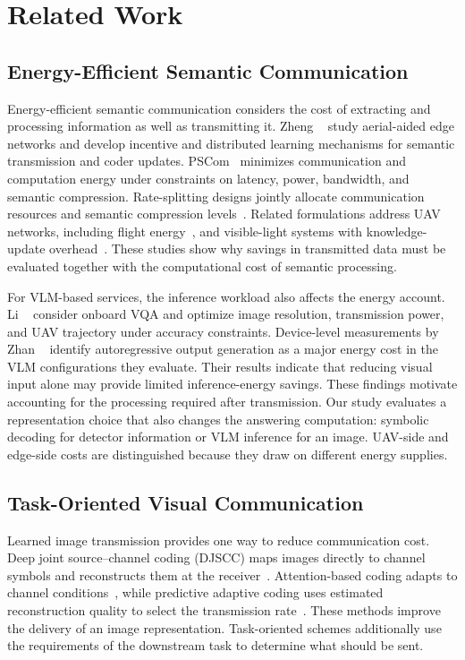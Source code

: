 \section{Related Work}\label{sec:related}

\subsection{Energy-Efficient Semantic Communication}
Energy-efficient semantic communication considers the cost of extracting
and processing information as well as transmitting it.
Zheng \etal~\cite{zheng2024aerialee} study aerial-aided edge networks
and develop incentive and distributed learning mechanisms for semantic
transmission and coder updates. PSCom~\cite{dai2025pscom} minimizes
communication and computation energy under constraints on latency,
power, bandwidth, and semantic compression. Rate-splitting designs
jointly allocate communication resources and semantic compression
levels~\cite{xu2025rsmagreen}. Related formulations address UAV networks,
including flight energy~\cite{wang2026rsma}, and visible-light systems
with knowledge-update overhead~\cite{zhao2026vlc}. These studies show
why savings in transmitted data must be evaluated together with the
computational cost of semantic processing.

For VLM-based services, the inference workload also affects the energy
account. Li \etal~\cite{li2026onboard} consider onboard VQA and optimize
image resolution, transmission power, and UAV trajectory under accuracy
constraints. Device-level measurements by Zhan
\etal~\cite{zhan2026seeing} identify autoregressive output generation
as a major energy cost in the VLM configurations they evaluate. Their
results indicate that reducing visual input alone may provide limited
inference-energy savings. These findings motivate accounting for the
processing required after transmission. Our study evaluates a
representation choice that also changes the answering computation:
symbolic decoding for detector information or VLM inference for an image.
UAV-side and edge-side costs are distinguished because they draw on
different energy supplies.

\subsection{Task-Oriented Visual Communication}
Learned image transmission provides one way to reduce communication
cost. Deep joint source--channel coding (DJSCC) maps images directly to
channel symbols and reconstructs them at the
receiver~\cite{bourtsoulatze2019djscc}. Attention-based coding adapts
to channel conditions~\cite{yang2023adjscc}, while predictive adaptive
coding uses estimated reconstruction quality to select the transmission
rate~\cite{zhang2023padc}. These methods improve the delivery of an
image representation. Task-oriented schemes additionally use the
requirements of the downstream task to determine what should be sent.

